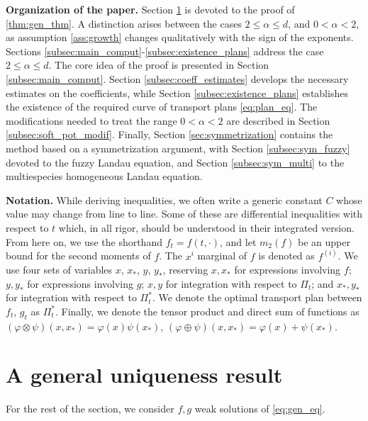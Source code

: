 \documentclass[10pt,oneside]{amsart}
\numberwithin{equation}{section}
\numberwithin{definition}{section}
\numberwithin{theorem}{section}
\numberwithin{lemma}{section}
\begin{document}
\textbf{Organization of the paper.} Section \ref{sec:gen_thm} is devoted to the proof of \cref{thm:gen_thm}. A distinction arises between the cases $2\leq \alpha\leq d$, and $0<\alpha <2$, as assumption \ref{ass:growth} changes qualitatively with the sign of the exponents. Sections \ref{subsec:main_comput}-\ref{subsec:existence_plans} address the case $2\leq \alpha\leq d$. The core idea of the proof is presented in Section \ref{subsec:main_comput}. Section \ref{subsec:coeff_estimates} develops the necessary estimates on the coefficients, while Section \ref{subsec:existence_plans} establishes the existence of the required curve of transport plans \cref{eq:plan_eq}. The modifications needed to treat the range $0 < \alpha < 2$ are described in Section \ref{subsec:soft_pot_modif}. Finally, Section \ref{sec:symmetrization} contains the method based on a symmetrization argument, with Section \ref{subsec:sym_fuzzy} devoted to the fuzzy Landau equation, and Section \ref{subsec:sym_multi} to the multiespecies homogeneous Landau equation.

\textbf{Notation.} While deriving inequalities, we often write a generic constant $C$ whose value may change from line to line. Some of these are differential inequalities with respect to $t$ which, in all rigor, should be understood in their integrated version. From here on, we use the shorthand $f_t=f(t,\cdot)$, and let $m_2(f)$ be an upper bound for the second moments of $f$. The $x^{i}$ marginal of $f$ is denoted as $f^{(i)}$. We use four sets of variables $x$, $x_*$, $y$, $y_*$, reserving $x,x_*$ for expressions involving $f$; $y,y_*$ for expressions involving $g$; $x,y$ for integration with respect to $\Pi_t$; and $x_*,y_*$ for integration with respect to $\Pi^*_t$. We denote the optimal transport plan between $f_t$, $g_t$ as $\Pi^*_t$. Finally, we denote the tensor product and direct sum of functions as $(\varphi\otimes \psi)(x,x_*)=\varphi(x)\psi(x_*)$, $(\varphi\oplus \psi)(x,x_*)=\varphi(x)+\psi(x_*)$.



\section{A general uniqueness result} \label{sec:gen_thm}

For the rest of the section, we consider $f,g$ weak solutions of \cref{eq:gen_eq}.
\end{document}
